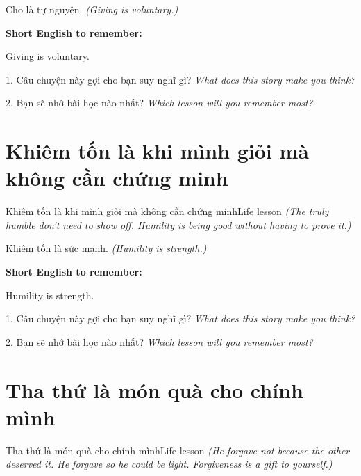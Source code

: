 \begin{baihoc}
Cho là tự nguyện.
\textit{(Giving is voluntary.)}
\end{baihoc}

\begin{ghinhoanh}
\textbf{Short English to remember:}

Giving is voluntary.

\end{ghinhoanh}

\begin{tuhocnhanh}
1. Câu chuyện này gợi cho bạn suy nghĩ gì? \textit{What does this story make you think?}

2. Bạn sẽ nhớ bài học nào nhất? \textit{Which lesson will you remember most?}
\end{tuhocnhanh}
\ngancach


\section{Khiêm tốn là khi mình giỏi mà không cần chứng minh}
\begin{truyen}{Khiêm tốn là khi mình giỏi mà không cần chứng minh}{Life lesson}
\textit{(The truly humble don't need to show off. Humility is being good without having to prove it.)}
\end{truyen}

\begin{baihoc}
Khiêm tốn là sức mạnh.
\textit{(Humility is strength.)}
\end{baihoc}

\begin{ghinhoanh}
\textbf{Short English to remember:}

Humility is strength.

\end{ghinhoanh}

\begin{tuhocnhanh}
1. Câu chuyện này gợi cho bạn suy nghĩ gì? \textit{What does this story make you think?}

2. Bạn sẽ nhớ bài học nào nhất? \textit{Which lesson will you remember most?}
\end{tuhocnhanh}
\ngancach


\section{Tha thứ là món quà cho chính mình}
\begin{truyen}{Tha thứ là món quà cho chính mình}{Life lesson}
\textit{(He forgave not because the other deserved it. He forgave so he could be light. Forgiveness is a gift to yourself.)}
\end{truyen}

